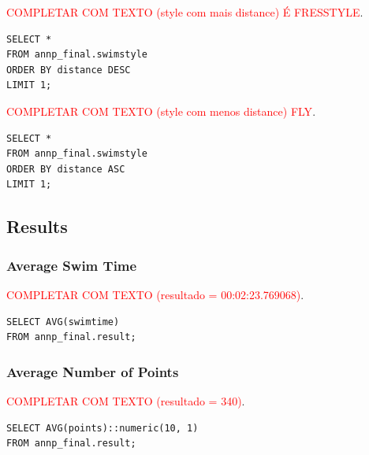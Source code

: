 \textcolor{red}{COMPLETAR COM TEXTO (style com mais distance) É FRESSTYLE}.

\begin{verbatim}
SELECT *
FROM annp_final.swimstyle
ORDER BY distance DESC
LIMIT 1;
\end{verbatim}

\textcolor{red}{COMPLETAR COM TEXTO (style com menos distance) FLY}.

\begin{verbatim}
SELECT *
FROM annp_final.swimstyle
ORDER BY distance ASC
LIMIT 1;
\end{verbatim}

\subsection{Results}

\subsubsection{Average Swim Time}

\textcolor{red}{COMPLETAR COM TEXTO (resultado = 00:02:23.769068)}.

\begin{verbatim}
SELECT AVG(swimtime)
FROM annp_final.result;
\end{verbatim}

\subsubsection{Average Number of Points}

\textcolor{red}{COMPLETAR COM TEXTO (resultado = 340)}.
\begin{verbatim}
SELECT AVG(points)::numeric(10, 1)
FROM annp_final.result;
\end{verbatim}
